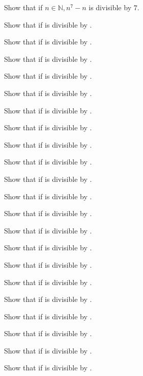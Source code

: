 \item Show that if $n\in\mathbb{N}, n^7 - n$ is divisible by $7$.
\item Show that if  is divisible by .
\item Show that if  is divisible by .
\item Show that if  is divisible by .
\item Show that if  is divisible by .
\item Show that if  is divisible by .
\item Show that if  is divisible by .
\item Show that if  is divisible by .
\item Show that if  is divisible by .
\item Show that if  is divisible by .
\item Show that if  is divisible by .
\item Show that if  is divisible by .
\item Show that if  is divisible by .
\item Show that if  is divisible by .
\item Show that if  is divisible by .
\item Show that if  is divisible by .
\item Show that if  is divisible by .
\item Show that if  is divisible by .
\item Show that if  is divisible by .
\item Show that if  is divisible by .
\item Show that if  is divisible by .
\item Show that if  is divisible by .

